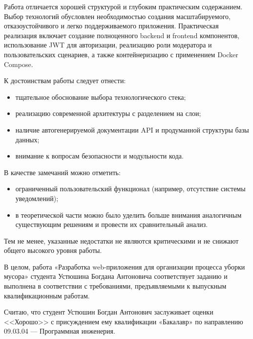\documentclass[critique]{SCWorks}
\begin{document}
Работа отличается хорошей структурой и глубоким практическим содержанием. 
Выбор технологий обусловлен необходимостью создания масштабируемого, 
отказоустойчивого и легко поддерживаемого приложения. Практическая 
реализация включает создание полноценного backend и frontend компонентов,
использование JWT для авторизации, реализацию роли модератора и 
пользовательских сценариев, а также контейнеризацию с применением 
Docker Compose.

К достоинствам работы следует отнести:
\begin{itemize}
\item тщательное обоснование выбора технологического стека;
\item реализацию современной архитектуры с разделением на слои;
\item наличие автогенерируемой документации API и продуманной структуры базы данных;
\item внимание к вопросам безопасности и модульности кода.
\end{itemize}
В качестве замечаний можно отметить:
\begin{itemize}
    \item ограниченный пользовательский функционал (например, 
    отсутствие системы уведомлений);
    \item в теоретической части можно было уделить больше внимания 
    аналогичным существующим решениям и провести их сравнительный анализ.
\end{itemize}

Тем не менее, указанные недостатки не являются критическими и не снижают 
общего высокого уровня работы.

В целом, работа «Разработка web-приложения для организации процесса уборки 
мусора» студента Устюшина Богдана Антоновича соответствует заданию и 
выполнена в соответствии с требованиями, предъявляемыми к выпускным 
квалификационным работам.

Считаю, что студент Устюшин Богдан Антонович заслуживает оценки <<Хорошо>> с 
присуждением ему квалификации «Бакалавр» по направлению 09.03.04 — Программная 
инженерия.

\signatureline
\end{document}
